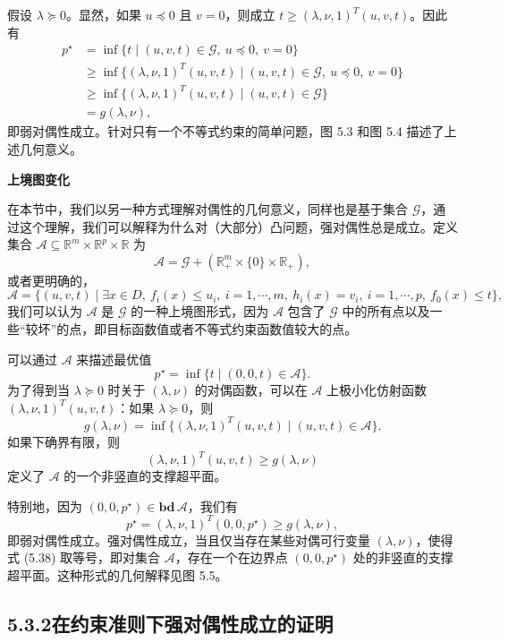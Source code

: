 \documentclass[UTF8,12pt,a4paper,fontset=fandol]{ctexart}
\begin{document}
假设 $\lambda\succeq 0$。显然，如果 $u\preceq 0$ 且 $v=0$，则成立 $t\geq(\lambda,\nu,1)^T(u,v,t)$。因此有
\[
\begin{aligned}
p^\star
&=\inf\{t\mid (u,v,t)\in\mathcal{G},\ u\preceq 0,\ v=0\}\\
&\geq \inf\{(\lambda,\nu,1)^T(u,v,t)\mid (u,v,t)\in\mathcal{G},\ u\preceq 0,\ v=0\}\\
&\geq \inf\{(\lambda,\nu,1)^T(u,v,t)\mid (u,v,t)\in\mathcal{G}\}\\
&=g(\lambda,\nu),
\end{aligned}
\]
即弱对偶性成立。针对只有一个不等式约束的简单问题，图 5.3 和图 5.4 描述了上述几何意义。

\noindent\textbf{上境图变化}

在本节中，我们以另一种方式理解对偶性的几何意义，同样也是基于集合 $\mathcal{G}$，通过这个理解，我们可以解释为什么对（大部分）凸问题，强对偶性总是成立。定义集合 $\mathcal{A}\subseteq\mathbb{R}^m\times\mathbb{R}^p\times\mathbb{R}$ 为
\begin{equation}
\mathcal{A}=\mathcal{G}+(\mathbb{R}_+^m\times\{0\}\times\mathbb{R}_+),
\tag{5.37}
\end{equation}
或者更明确的，
\[
\mathcal{A}=\{(u,v,t)\mid \exists x\in D,\ f_i(x)\leq u_i,\ i=1,\cdots,m,\ h_i(x)=v_i,\ i=1,\cdots,p,\ f_0(x)\leq t\},
\]
我们可以认为 $\mathcal{A}$ 是 $\mathcal{G}$ 的一种上境图形式，因为 $\mathcal{A}$ 包含了 $\mathcal{G}$ 中的所有点以及一些“较坏”的点，即目标函数值或者不等式约束函数值较大的点。

可以通过 $\mathcal{A}$ 来描述最优值
\[
p^\star=\inf\{t\mid (0,0,t)\in\mathcal{A}\}.
\]
为了得到当 $\lambda\succeq 0$ 时关于 $(\lambda,\nu)$ 的对偶函数，可以在 $\mathcal{A}$ 上极小化仿射函数 $(\lambda,\nu,1)^T(u,v,t)$：如果 $\lambda\succeq 0$，则
\[
g(\lambda,\nu)=\inf\{(\lambda,\nu,1)^T(u,v,t)\mid (u,v,t)\in\mathcal{A}\}.
\]
如果下确界有限，则
\[
(\lambda,\nu,1)^T(u,v,t)\geq g(\lambda,\nu)
\]
定义了 $\mathcal{A}$ 的一个非竖直的支撑超平面。

特别地，因为 $(0,0,p^\star)\in\mathbf{bd}\,\mathcal{A}$，我们有
\begin{equation}
p^\star=(\lambda,\nu,1)^T(0,0,p^\star)\geq g(\lambda,\nu),
\tag{5.38}
\end{equation}
即弱对偶性成立。强对偶性成立，当且仅当存在某些对偶可行变量 $(\lambda,\nu)$，使得式 (5.38) 取等号，即对集合 $\mathcal{A}$，存在一个在边界点 $(0,0,p^\star)$ 处的非竖直的支撑超平面。这种形式的几何解释见图 5.5。

\subsection*{5.3.2\quad 在约束准则下强对偶性成立的证明}
\end{document}
